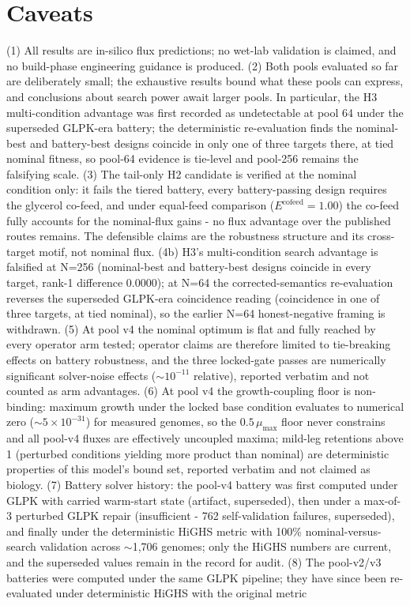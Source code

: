\documentclass[12pt,a4paper]{article}
\begin{document}
\paragraph{} %

\section{Caveats}
(1) All results are in-silico flux predictions; no wet-lab validation is claimed, and no build-phase engineering guidance is produced. (2) Both pools evaluated so far are deliberately small; the exhaustive results bound what these pools can express, and conclusions about search power await larger pools. In particular, the H3 multi-condition advantage was first recorded as undetectable at pool 64 under the superseded GLPK-era battery; the deterministic re-evaluation finds the nominal-best and battery-best designs coincide in only one of three targets there, at tied nominal fitness, so pool-64 evidence is tie-level and pool-256 remains the falsifying scale. (3) The tail-only H2 candidate is verified at the nominal condition only: it fails the tiered battery, every battery-passing design requires the glycerol co-feed, and under equal-feed comparison ($E^{\mathrm{cofeed}} = 1.00$) the co-feed fully accounts for the nominal-flux gains - no flux advantage over the published routes remains. The defensible claims are the robustness structure and its cross-target motif, not nominal flux. (4b) H3's multi-condition search advantage is falsified at N=256 (nominal-best and battery-best designs coincide in every target, rank-1 difference 0.0000); at N=64 the corrected-semantics re-evaluation reverses the superseded GLPK-era coincidence reading (coincidence in one of three targets, at tied nominal), so the earlier N=64 honest-negative framing is withdrawn. (5) At pool v4 the nominal optimum is flat and fully reached by every operator arm tested; operator claims are therefore limited to tie-breaking effects on battery robustness, and the three locked-gate passes are numerically significant solver-noise effects ($\sim 10^{-11}$ relative), reported verbatim and not counted as arm advantages. (6) At pool v4 the growth-coupling floor is non-binding: maximum growth under the locked base condition evaluates to numerical zero ($\sim 5\times 10^{-31}$) for measured genomes, so the $0.5\,\mu_{\max}$ floor never constrains and all pool-v4 fluxes are effectively uncoupled maxima; mild-leg retentions above 1 (perturbed conditions yielding more product than nominal) are deterministic properties of this model's bound set, reported verbatim and not claimed as biology. (7) Battery solver history: the pool-v4 battery was first computed under GLPK with carried warm-start state (artifact, superseded), then under a max-of-3 perturbed GLPK repair (insufficient - 762 self-validation failures, superseded), and finally under the deterministic HiGHS metric with 100\% nominal-versus-search validation across $\sim$1{,}706 genomes; only the HiGHS numbers are current, and the superseded values remain in the record for audit. (8) The pool-v2/v3 batteries were computed under the same GLPK pipeline; they have since been re-evaluated under deterministic HiGHS with the original metric 
\end{document}
